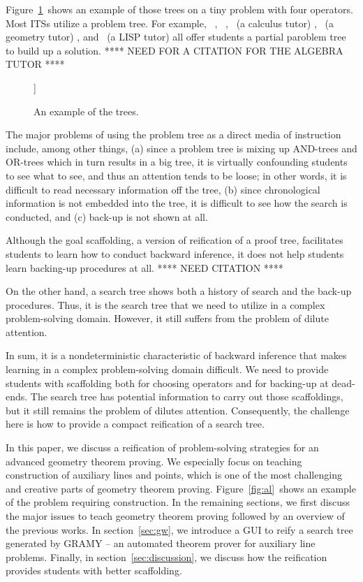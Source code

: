 Figure~\ref{fig:tree}~shows an example of those trees on a tiny problem
with four operators.  Most ITSs utilize a problem tree.  For example,
\AlgebraTutor\ \cite{WhoIsIt}, \GeometryTutor\ \cite{Anderson85},
\RelatedRatesTutor\ (a calculus tutor) \cite{Singley90}, \Angle\ (a
geometry tutor) \cite{Koedinger93}, and \Gil\ (a LISP tutor)
\cite{Merrill94} all offer students a partial paroblem tree to build up
a solution.   **** NEED FOR A CITATION FOR THE ALGEBRA TUTOR ****

\begin{figure}[tb]
 \center
 [[ SIMPLE EXAMPLES ARE SHOWN HERE ]]
 \caption{An example of the trees.}
 \label{fig:tree}
\end{figure}

The major problems of using the problem tree as a direct media of
instruction include, among other things, (a) since a problem tree is
mixing up AND-trees and OR-trees which in turn results in a big tree, it
is virtually confounding students to see what to see, and thus an
attention tends to be loose; in other words, it is difficult to read
necessary information off the tree, (b) since chronological information
is not embedded into the tree, it is difficult to see how the search is
conducted, and (c) back-up is not shown at all.

Although the goal scaffolding, a version of reification of a proof tree,
facilitates students to learn how to conduct backward inference, it does
not help students learn backing-up procedures at all.  **** NEED
CITATION ****

On the other hand, a search tree shows both a history of search and the
back-up procedures.  Thus, it is the search tree that we need to utilize
in a complex problem-solving domain.  However, it still suffers from the
problem of dilute attention.  

In sum, it is a nondeterministic characteristic of backward inference
that makes learning in a complex problem-solving domain difficult.  We
need to provide students with scaffolding both for choosing operators
and for backing-up at dead-ends.  The search tree has potential
information to carry out those scaffoldings, but it still remains the
problem of dilutes attention.  Consequently, the challenge here is how
to provide a compact reification of a search tree.

In this paper, we discuss a reification of problem-solving strategies
for an advanced geometry theorem proving.  We especially focus on
teaching construction of auxiliary lines and points, which is one of the
most challenging and creative parts of geometry theorem proving.
Figure~\ref{fig:al}~shows an example of the problem requiring
construction.  In the remaining sections, we first discuss the major
issues to teach geometry theorem proving followed by an overview of the
previous works.  In section~\ref{sec:gw}, we introduce a GUI to reify a
search tree generated by GRAMY -- an automated theorem prover for
auxiliary line problems.  Finally, in section~\ref{sec:discussion}, we
discuss how the reification provides students with better scaffolding.

